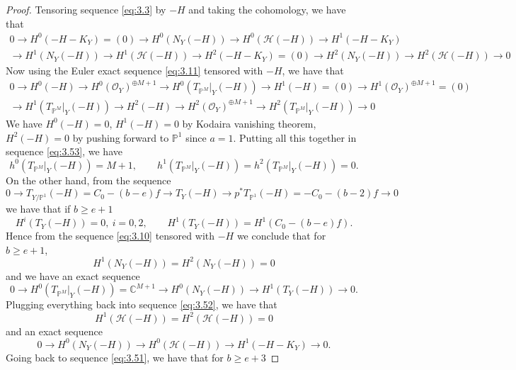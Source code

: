 \documentclass[11pt,reqno]{amsart}
\theoremstyle{plain}
\theoremstyle{definition}
\newcommand{\PP}{\mathbb{P}}
\newcommand{\PM}{\mathbb{P}^M}
\newcommand{\OO}{\mathcal{O}}
\newcommand{\NY}{N_{Y}}
\newcommand{\Hc}{\mathcal{H}}
\newcommand{\TP}{T_{\PM}|_Y}
\begin{document}
\begin{proof}
Tensoring sequence \eqref{eq:3.3} by $-H$ and taking the cohomology, we have that
\begin{multline}\label{eq:3.52}
0\to H^0(-H-K_Y)=(0)\to H^0(\NY(-H))\to H^0(\Hc(-H))\to H^1(-H-K_Y)\\
\to H^1(\NY(-H))\to H^1(\Hc(-H))\to H^2(-H-K_Y)=(0)\to H^2(\NY(-H))\to H^2(\Hc(-H))\to 0
\end{multline}
Now using the Euler exact sequence \eqref{eq:3.11} tensored with $-H$, we have that
\begin{multline}\label{eq:3.53}
0\to H^0(-H)\to H^0(\OO_Y)^{\oplus M+1}\to H^0(\TP(-H))\to H^1(-H)=(0)\to H^1(\OO_Y)^{\oplus M+1}=(0)\\
\to H^1(\TP(-H))\to H^2(-H)\to H^2(\OO_Y)^{\oplus M+1}\to H^2(\TP(-H))\to 0
\end{multline}
We have $H^0(-H)=0$, $H^1(-H)=0$ by Kodaira vanishing theorem, $H^2(-H)=0$ by pushing forward to $\PP^1$ since $a=1$. Putting all this together in sequence \eqref{eq:3.53}, we have
\begin{equation}\label{eq:3.54}
h^0(\TP(-H))=M+1,\qquad h^1(\TP(-H))=h^2(\TP(-H))=0 .
\end{equation}
On the other hand, from the sequence
\begin{equation}\label{eq:3.55}
0\to T_{Y/\PP^1}(-H)=C_0-(b-e)f\to T_Y(-H)\to p^*T_{\PP^1}(-H)=-C_0-(b-2)f\to 0
\end{equation}
we have that if $b\ge e+1$
\begin{equation}\label{eq:3.56}
H^i(T_Y(-H))=0,\ i=0,2,\qquad H^1(T_Y(-H))=H^1(C_0-(b-e)f).
\end{equation}
Hence from the sequence \eqref{eq:3.10} tensored with $-H$ we conclude that for $b\ge e+1$,
\begin{equation}\label{eq:3.57}
H^1(\NY(-H))=H^2(\NY(-H))=0
\end{equation}
and we have an exact sequence
\begin{equation}\label{eq:3.58}
0\to H^0(\TP(-H))=\mathbb{C}^{M+1}\to H^0(\NY(-H))\to H^1(T_Y(-H))\to 0 .
\end{equation}
Plugging everything back into sequence \eqref{eq:3.52}, we have that
\begin{equation}\label{eq:3.59}
H^1(\Hc(-H))=H^2(\Hc(-H))=0
\end{equation}
and an exact sequence
\begin{equation}\label{eq:3.60}
0\to H^0(\NY(-H))\to H^0(\Hc(-H))\to H^1(-H-K_Y)\to 0 .
\end{equation}
Going back to sequence \eqref{eq:3.51}, we have that for $b\ge e+3$

\end{proof}
\end{document}
